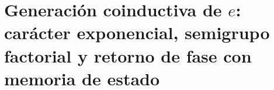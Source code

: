 \chapter{Generación coinductiva de \(e\): carácter exponencial, semigrupo factorial y retorno de fase con memoria de estado}
\label{chap:p3-final:29:generacion_e}

